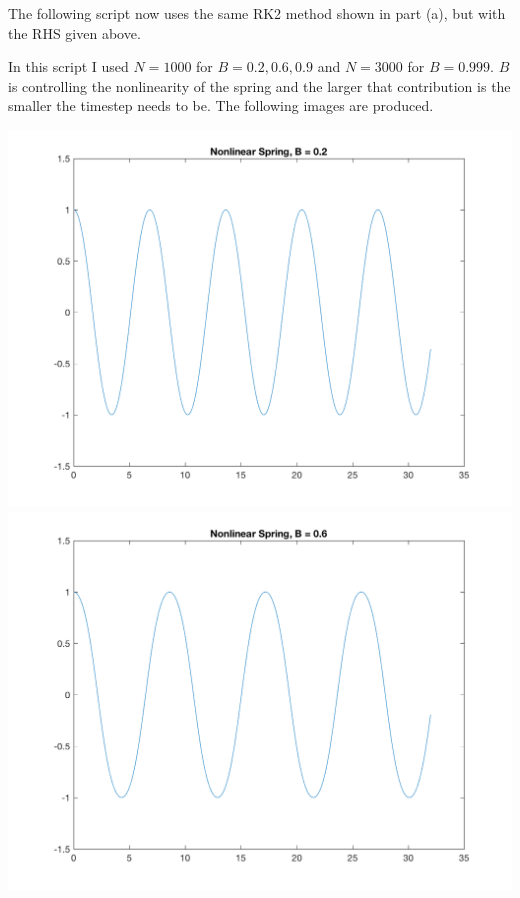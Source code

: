 \documentclass[11pt, oneside]{article}
\begin{document}
\begin{enumerate}
      The following script now uses the same RK2 method shown in part (a), but with the RHS given
      above.
      
      In this script I used $N = 1000$ for $B = 0.2, 0.6, 0.9$ and $N = 3000$ for
      $B = 0.999$.
      $B$ is controlling the nonlinearity of the spring and the larger that
      contribution is the smaller the timestep needs to be.
      The following images are produced.
      \begin{center}
        \includegraphics[scale=.4]{Figures/01_11.png}
        \includegraphics[scale=.4]{Figures/01_12.png}

\end{center}
\end{enumerate}
\end{document}
